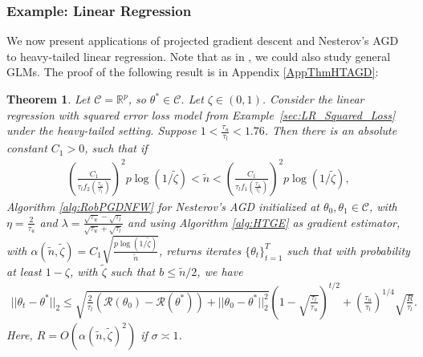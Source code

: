 \documentclass{article}
\newtheorem{theorem}{Theorem}
\newtheorem{remark}{\textbf{Remark}}
\begin{document}

\subsubsection{Example: Linear Regression}

We now present applications of projected gradient descent and Nesterov's AGD to heavy-tailed linear regression. Note that as in \cite{RE}, we could also study general GLMs.
The proof of the following result is in Appendix \ref{AppThmHTAGD}:

\begin{theorem}
\label{theorem:htAGD}
Let $\mathcal{C} = \mathbb{R}^p$, so $\theta^* \in \mathcal{C}$. Let $\zeta \in (0, 1)$. Consider the linear regression with squared error loss model from Example~\ref{sec:LR_Squared_Loss} under the heavy-tailed setting. Suppose $1 < \frac{\tau_u}{\tau_l} < 1.76$. Then there is an absolute constant $C_1 > 0$, such that if 
\begin{align*}
\left(\frac{C_1}{\tau_l f_2\left(\frac{\tau_u}{\tau_l}\right)}\right)^2p \log(1/\widetilde{\zeta}) < \widetilde{n} < \left(\frac{C_1}{\tau_l f_1\left(\frac{\tau_u}{\tau_l}\right)}\right)^2p \log(1/\widetilde{\zeta}),
\end{align*}
Algorithm \ref{alg:RobPGDNFW} for Nesterov's AGD initialized at $\theta_0, \theta_1 \in \mathcal{C}$, with $\eta = \frac{2}{\tau_u}$ and $\lambda = \frac{\sqrt{\tau_u} - \sqrt{\tau_l}}{\sqrt{\tau_u} + \sqrt{\tau_l}}$ and using Algorithm \ref{alg:HTGE} as gradient estimator, with $\alpha(\widetilde{n}, \widetilde{\zeta}) = C_1\sqrt{\frac{p \log(1/\widetilde{\zeta})}{\widetilde{n}}}$, returns iterates $\{\theta_t\}_{t = 1}^T$ such that with probability at least $1 - \zeta$, with $\widetilde{\zeta}$ such that $b \leq \widetilde{n}/2$, we have
\begin{align}
\label{eq:ht_Nester}
||\theta_t - \theta^*||_2 \leq \sqrt{\frac{2}{\tau_l}\left(\mathcal{R}(\theta_0) - \mathcal{R}(\theta^*)\right) + ||\theta_0 - \theta^*||_2^2}\left(1 - \sqrt{\frac{\tau_l}{\tau_u}}\right)^{t/2} + \left(\frac{\tau_u}{\tau_l}\right)^{1/4}\sqrt{\frac{R}{\tau_l}}.
\end{align}
Here, $R = O\left(\alpha(\widetilde{n}, \widetilde{\zeta})^2\right)$ if $\sigma \asymp 1$.
\end{theorem}
\end{document}

